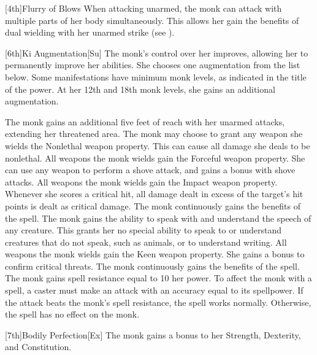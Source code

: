 [4th]{Flurry of Blows}
When attacking unarmed, the monk can attack with multiple parts of her body simultaneously.
This allows her gain the benefits of dual wielding with her unarmed strike (see ).


[6th]{Ki Augmentation}[Su]
The monk's control over her \ki improves, allowing her to permanently improve her abilities.
She chooses one \ki augmentation from the list below.
Some \ki manifestations have minimum monk levels, as indicated in the title of the power.
At her 12th and 18th monk levels, she gains an additional \ki augmentation.

The monk gains an additional five feet of reach with her unarmed attacks, extending her threatened area.
The monk may choose to grant any weapon she wields the Nonlethal weapon property.
This can cause all damage she deals to be nonlethal.
All weapons the monk wields gain the Forceful weapon property.
She can use any weapon to perform a shove attack, and gains a  bonus with shove attacks.
All weapons the monk wields gain the Impact weapon property.
Whenever she scores a critical hit, all damage dealt in excess of the target's hit points is dealt as critical damage.
The monk continuously gains the benefits of the  spell.
The monk gains the ability to speak with and understand the speech of any creature.
This grants her no special ability to speak to or understand creatures that do not speak, such as animals, or to understand writing.
All weapons the monk wields gain the Keen weapon property.
She gains a  bonus to confirm critical threats.
The monk continuously gains the benefits of the  spell.
The monk gains spell resistance equal to 10 \add her \ki power.
To affect the monk with a spell, a caster must make an attack with an accuracy equal to its spellpower.
If the attack beats the monk's spell resistance, the spell works normally.
Otherwise, the spell has no effect on the monk.

[7th]{Bodily Perfection}[Ex]
The monk gains a  bonus to her Strength, Dexterity, and Constitution.

